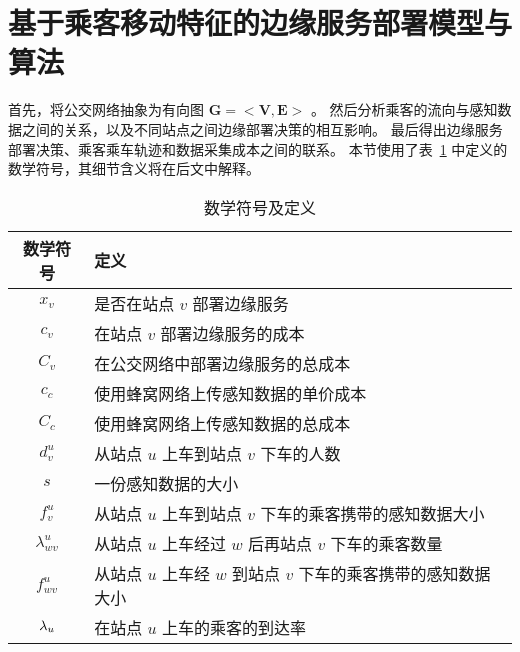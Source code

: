 \section{基于乘客移动特征的边缘服务部署模型与算法}

首先，将公交网络抽象为有向图 $\boldsymbol{G}=<\boldsymbol{V}, \boldsymbol{E}>$ 。
然后分析乘客的流向与感知数据之间的关系，以及不同站点之间边缘部署决策的相互影响。
最后得出边缘服务部署决策、乘客乘车轨迹和数据采集成本之间的联系。
本节使用了表~\ref{table_notations_monet} 中定义的数学符号，其细节含义将在后文中解释。

\begin{table}[!t]
  \caption{数学符号及定义}
  \vspace{-1em}
  \label{table_notations_monet}
  \centering
  \begin{tabular}{|c|p{10.5cm}|}
    \hline
    \textbf{数学符号} & \textbf{定义}\\
    \hline
    $x_v$ & 是否在站点 $v$ 部署边缘服务\\\hline
    $c_v$ & 在站点 $v$ 部署边缘服务的成本\\\hline
    $C_v$ & 在公交网络中部署边缘服务的总成本\\\hline
    $c_c$ &  使用蜂窝网络上传感知数据的单价成本\\\hline
    $C_c$ &  使用蜂窝网络上传感知数据的总成本\\\hline
    $d_v^u$ & 从站点 $u$ 上车到站点 $v$ 下车的人数\\\hline
    $s$ & 一份感知数据的大小\\\hline
    $f_v^u$ & 从站点 $u$ 上车到站点 $v$ 下车的乘客携带的感知数据大小\\\hline
    $\lambda^u_{wv}$ & 从站点 $u$ 上车经过 $w$ 后再站点 $v$ 下车的乘客数量\\\hline
    $f_{wv}^u$ & 从站点 $u$ 上车经 $w$ 到站点 $v$ 下车的乘客携带的感知数据大小\\\hline
    ${\lambda}_{u}$ & 在站点 $u$ 上车的乘客的到达率\\\hline

\end{tabular}
\end{table}
